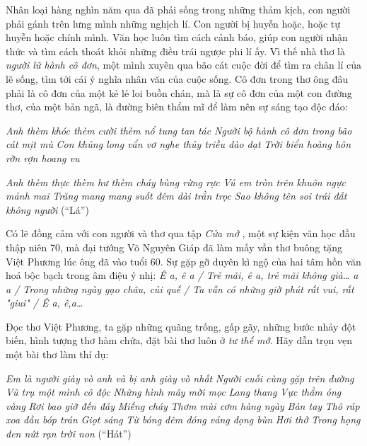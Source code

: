 \documentclass[../main.tex]{subfiles}
\begin{document}
\begin{multicols}{2}
Nhân loại hàng nghìn năm qua đã phải sống trong những thảm kịch, con người phải gánh trên lưng mình những nghịch lí. Con người bị huyễn hoặc, hoặc tự huyễn hoặc chính mình. Văn học luôn tìm cách cảnh báo, giúp con người nhận thức và tìm cách thoát khỏi những điều trái ngược phi lí ấy. Vì thế nhà thơ là \textit{người lữ hành cô đơn}, một mình xuyên qua bão cát cuộc đời để tìm ra chân lí của lẽ sống, tìm tới cái ý nghĩa nhân văn của cuộc sống. Cô đơn trong thơ ông đâu phải là cô đơn của một kẻ lẻ loi buồn chán, mà là sự cô đơn của một con đường thơ, của một bản ngã, là đường biên thẩm mĩ để làm nên sự sáng tạo độc đáo: 
\begin{blockquote}
        
\textit{Anh thèm khóc thèm cười thèm nổ tung tan tác}        
\textit{Người bộ hành cô đơn trong bão cát mịt mù}        
\textit{Con khủng long vẩn vơ nghe thủy triều dào dạt} 
\textit{Trời biển hoàng hôn rờn rợn hoang vu} 
        
\textit{Anh thèm thực thèm hư thèm cháy bùng rừng rực}        
\textit{Vú em tròn trên khuôn ngực mảnh mai}        
\textit{Trăng mang mang suốt đêm dài trằn trọc}        
\textit{Sao không tên soi trái đất không người}        
(“Lá”) 
     \end{blockquote}
          
Có lẽ đồng cảm với con người và thơ qua tập \textit{Cửa mở }, một sự kiện văn học đầu thập niên 70, mà đại tướng Võ Nguyên Giáp đã làm mấy vần thơ buông tặng Việt Phương lúc ông đã vào tuổi 60. Sự gặp gỡ duyên kì ngộ của hai tâm hồn văn hoá bộc bạch trong âm điệu ý nhị: \textit{Ê a, ê a / Trẻ mãi, ê a, trẻ mãi không già… a a / Trong những ngày gạo châu, củi quế / Ta vẫn có những giờ phút rất vui, rất "giui" / Ê a, ê,a…} 
 
Đọc thơ Việt Phương, ta gặp những quãng trống, gấp gãy, những bước nhảy đột biến, hình tượng thơ hàm chứa, đặt bài thơ luôn ở \textit{tư thế mở}. Hãy dẫn trọn vẹn một bài thơ làm thí dụ: 
\begin{blockquote}
                                   
\textit{Em là người giày vò anh và bị anh giày vò nhất}        
\textit{Người cuối cùng gặp trên đường}        
\textit{Vũ trụ một mình cô độc}        
\textit{Những hình mây mời mọc}        
\textit{Lang thang}        
\textit{Vực thẳm óng vàng}        
\textit{Rơi bao giờ đến đáy}        
\textit{Miếng cháy}        
\textit{Thơm mùi cơm hàng ngày}        
\textit{Bàn tay}        
\textit{Thô ráp xoa đầu bóp trán}        
\textit{Giọt sáng}        
\textit{Từ bóng đêm đóng váng đọng bùn}        
\textit{Hơi thở}        
\textit{Trong họng đen nứt rạn trời non}        
(“Hát”) 
  \end{blockquote}
            

\end{multicols}
\end{document}
